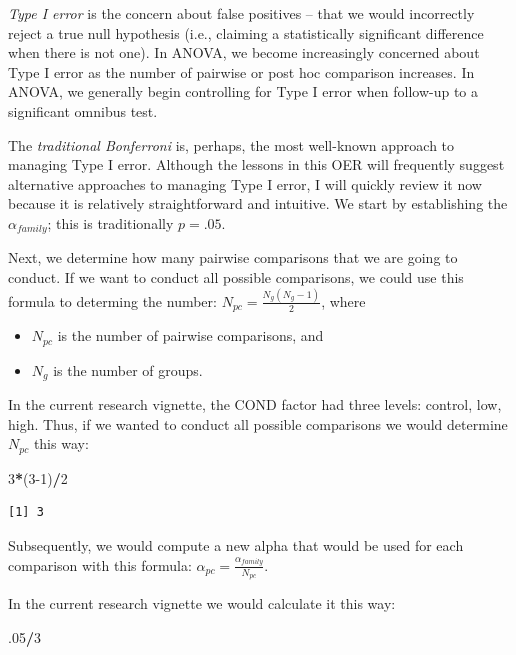 \documentclass[
  11pt,
]{book}
\newenvironment{Shaded}{\begin{snugshade}}{\end{snugshade}}
\newcommand{\DecValTok}[1]{\textcolor[rgb]{0.06,0.06,0.06}{#1}}
\newcommand{\NormalTok}[1]{#1}
\newcommand{\SpecialCharTok}[1]{\textcolor[rgb]{0.43,0.43,0.43}{\textbf{#1}}}
\providecommand{\tightlist}{%
  \setlength{\itemsep}{0pt}\setlength{\parskip}{0pt}}
\begin{document}
\emph{Type I error} is the concern about false positives -- that we would incorrectly reject a true null hypothesis (i.e., claiming a statistically significant difference when there is not one). In ANOVA, we become increasingly concerned about Type I error as the number of pairwise or post hoc comparison increases. In ANOVA, we generally begin controlling for Type I error when follow-up to a significant omnibus test.

The \emph{traditional Bonferroni} is, perhaps, the most well-known approach to managing Type I error. Although the lessons in this OER will frequently suggest alternative approaches to managing Type I error, I will quickly review it now because it is relatively straightforward and intuitive. We start by establishing the \(\alpha_{family}\); this is traditionally \(p = .05\).

Next, we determine how many pairwise comparisons that we are going to conduct. If we want to conduct all possible comparisons, we could use this formula to determing the number: \(N_{pc}=\frac{N_{g}(N_{g}-1)}{2}\), where

\begin{itemize}
\tightlist
\item
  \(N_{pc}\) is the number of pairwise comparisons, and
\item
  \(N_{g}\) is the number of groups.
\end{itemize}

In the current research vignette, the COND factor had three levels: control, low, high. Thus, if we wanted to conduct all possible comparisons we would determine \(N_{pc}\) this way:

\begin{Shaded}
\begin{Highlighting}[]
\DecValTok{3}\SpecialCharTok{*}\NormalTok{(}\DecValTok{3{-}1}\NormalTok{)}\SpecialCharTok{/}\DecValTok{2}
\end{Highlighting}
\end{Shaded}

\begin{verbatim}
[1] 3
\end{verbatim}

Subsequently, we would compute a new alpha that would be used for each comparison with this formula: \(\alpha_{pc}=\frac{\alpha_{family}}{N_{pc}}\).

In the current research vignette we would calculate it this way:

\begin{Shaded}
\begin{Highlighting}[]
\NormalTok{.}\DecValTok{05}\SpecialCharTok{/}\DecValTok{3}
\end{Highlighting}
\end{Shaded}
\end{document}
